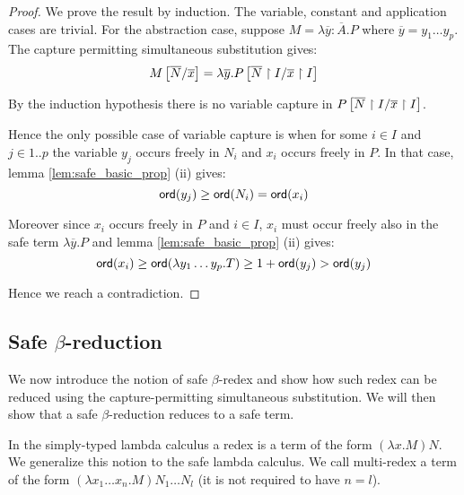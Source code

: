 \begin{proof}
We prove the result by induction. The variable, constant and application cases are trivial.
For the abstraction case, suppose $M = \lambda \overline{y} : \overline{A}. P$ where $\overline{y} = y_1 \ldots y_p$. The capture permitting
simultaneous substitution gives:
$$M \left[ \overline{N}/\overline{x} \right] = \lambda \overline{y} . P
\left[ \overline{N} \upharpoonright I/\overline{x} \upharpoonright I \right]$$


By the induction hypothesis there is no variable capture in $P
\left[ \overline{N} \upharpoonright I/\overline{x} \upharpoonright I \right]$.

Hence the only possible case of variable capture is when for some $i \in I$ and $j \in 1..p$ the variable $y_j$ occurs freely
in $N_i$ and $x_i$ occurs freely in $P$. In that case, lemma \ref{lem:safe_basic_prop} (ii) gives:
$$ {\sf ord}(y_j) \geq {\sf ord}(N_i) = {\sf ord}(x_i)$$

Moreover since $x_i$ occurs freely in $P$ and $i\in I$, $x_i$ must occur freely also in the safe term $\lambda \overline{y}. P$
and lemma \ref{lem:safe_basic_prop} (ii) gives:
$$ {\sf ord}(x_i) \geq {\sf ord}(\lambda y_1 \ldots y_p . T) \geq 1+ {\sf ord}(y_j) > {\sf ord}(y_j)$$

Hence we reach a contradiction.
\end{proof}


\subsection{Safe $\beta$-reduction}

We now introduce the notion of safe $\beta$-redex and show how such redex can be reduced using the
capture-permitting simultaneous substitution. We will then show that
a safe $\beta$-reduction reduces to a safe term.


In the simply-typed lambda calculus a redex is a term of the form $(\lambda x . M) N$.
We generalize this notion to the safe lambda calculus. We call multi-redex a term of the form
$(\lambda x_1 \ldots x_n . M) N_1 \ldots N_l$ (it is not required to have $n=l$).


